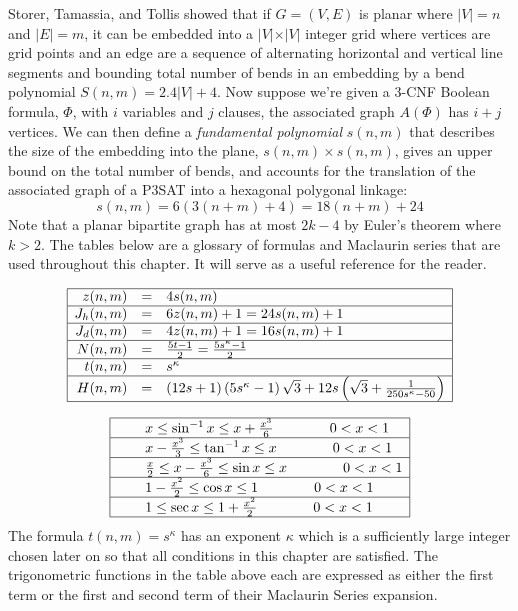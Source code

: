\documentclass[10pt]{CSUNthesis}
\theoremstyle{plain}%
\theoremstyle{definition}
\theoremstyle{remark}
\newcommand{\lr}[1]{\left( #1 \right)}
\newcommand{\vlr}[1]{\left\vert #1 \right\vert}
\begin{document}
Storer, Tamassia, and Tollis \cite{storer1984minimal,tamassia1987efficient} showed that if $G=(V,E)$ is planar where $\vlr{V}=n$ and $\vlr{E} = m$, it can be embedded into a $\vert V \vert \times \vert V \vert$ integer grid where vertices are grid points and an edge are a sequence of alternating horizontal and vertical line segments and bounding total number of bends in an embedding by a bend polynomial $S(n,m)=2.4 \vert V\vert + 4$.  
Now suppose we're given a 3-CNF Boolean formula, $\Phi$, with $i$ variables and $j$ clauses, the associated graph $A(\Phi)$ has $i+j$ vertices.  
We can then define a \textit{fundamental polynomial} $s(n,m)$ that describes the size of the embedding into the plane, $s(n,m) \times s(n,m)$, gives an upper bound on the total number of bends, and accounts for the translation of the associated graph of a P3SAT into a hexagonal polygonal linkage:
$$s(n,m) = 6\lr{3 (n+m) + 4} = 18 (n+m) + 24$$
Note that a planar bipartite graph has at most $2k-4$ by Euler's theorem where $k>2$.  
The tables below are a glossary of formulas and Maclaurin series that are used throughout this chapter.
It will serve as a useful reference for the reader.

$$
\begin{array}{|rcl|}
\hline
z(n,m)		&=& 4 s(n,m)\\\hline
J_h (n,m) 	&=& 6z(n,m)+1 = 24s(n,m)+1 \\\hline
J_d (n,m) 	&=& 4z(n,m)+1												= 16s(n,m)+1  			\\\hline
N(n,m)		&=& \frac{5t-1}{2}											= \frac{5s^\kappa-1}{2}	\\\hline
t(n,m)		&=& s^\kappa																		\\\hline
H(n,m) 		&=&  (12s+1)  \lr{5s^\kappa -1}  \sqrt{3} + 12s \lr{\sqrt{3}+ \frac{1}{250s^\kappa -50}}				\\\hline
\end{array}
$$


$$
\begin{array}{|rcl|}
\hline
&& x 				\leq \sin^{-1} x \leq x + \frac{x^3}{6} \qquad\qquad 0< x <1 \\\hline
&& x - \frac{x^3}{3}\leq \tan^{-1} x \leq x 				\qquad\qquad 0< x < 1\\\hline
&& \frac{x}{2}\leq x - \frac{x^3}{6}\leq \sin x 	 \leq x 				\qquad\qquad 0< x < 1\\\hline
&& 1 - \frac{x^2}{2}\leq \cos x 	 \leq 1 				\qquad\qquad 0< x < 1\\\hline
&& 1 				\leq \sec x 	 \leq 1 + \frac{x^2}{2} \qquad\qquad 0< x < 1\\\hline
\end{array}
$$
The formula $t(n,m)=s^\kappa$ has an exponent $\kappa$ which is a sufficiently large integer chosen later on so that all conditions in this chapter are satisfied.
The trigonometric functions in the table above each are expressed as either the first term or the first and second term of their Maclaurin Series expansion.
\end{document}
